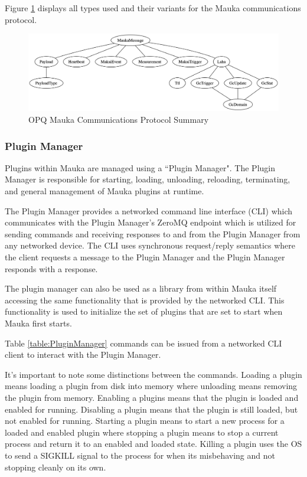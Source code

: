 Figure \ref{fig:mauka_messages} displays all types used and their variants for the Mauka communications protocol.

\begin{figure}
	\centering
	\includegraphics[width=\linewidth]{figures/mauka_messages.png}
	\caption{OPQ Mauka Communications Protocol Summary}
	\label{fig:mauka_messages}
\end{figure}

\subsubsection{Plugin Manager}
Plugins within Mauka are managed using a ``Plugin Manager". The Plugin Manager is responsible for starting, loading, unloading, reloading, terminating, and general management of Mauka plugins at runtime. 

The Plugin Manager provides a networked command line interface (CLI) which communicates with the Plugin Manager's ZeroMQ endpoint which is utilized for sending commands and receiving responses to and from the Plugin Manager from any networked device. The CLI uses synchronous request/reply semantics where the client requests a message to the Plugin Manager and the Plugin Manager responds with a response. 

The plugin manager can also be used as a library from within Mauka itself accessing the same functionality that is provided by the networked CLI. This functionality is used to initialize the set of plugins that are set to start when Mauka first starts.

Table \ref{table:PluginManager} commands can be issued from a networked CLI client to interact with the Plugin Manager. 

It's important to note some distinctions between the commands. Loading a plugin means loading a plugin from disk into memory where unloading means removing the plugin from memory. Enabling a plugins means that the plugin is loaded and enabled for running. Disabling a plugin means that the plugin is still loaded, but not enabled for running. Starting a plugin means to start a new process for a loaded and enabled plugin where stopping a plugin means to stop a current process and return it to an enabled and loaded state. Killing a plugin uses the OS to send a SIGKILL signal to the process for when its misbehaving and not stopping cleanly on its own.

